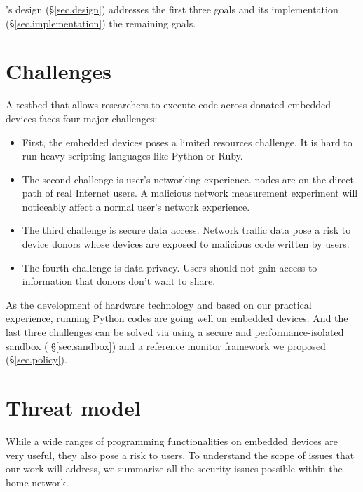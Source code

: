 \sysname's design (\S\ref{sec.design}) addresses the first three goals and its implementation (\S\ref{sec.implementation}) the remaining goals.

\section{Challenges}
\label{ssec.challenges}
A testbed that allows researchers to execute code across donated embedded devices faces four major challenges: 
\begin{itemize}
\item First, the embedded devices poses a limited resources challenge. It is hard to run heavy scripting languages like Python or Ruby. 
\item The second challenge is user's networking experience. \sysname nodes are on the direct path of real Internet users. A malicious network measurement experiment will noticeably affect a normal user's network experience. 
\item The third challenge is secure data access. Network traffic data pose a risk to device donors whose devices are exposed to malicious code written by users. 
\item The fourth challenge is data privacy. Users should not gain access to information that donors don't want to share.
\end{itemize}
As the development of hardware technology and based on our practical experience, running Python codes are going well on embedded devices. And the last three challenges can be solved via using a secure and performance-isolated sandbox ( \S{\ref{sec.sandbox}}) and a reference monitor framework we proposed (\S{\ref{sec.policy}}).

\section{Threat model}
\label{ssec.threat_models}
While a wide ranges of programming functionalities on embedded devices are 
very useful, they also pose a risk to users. To understand the scope of 
issues that our work will address, we summarize all the security issues 
possible within the home network.

